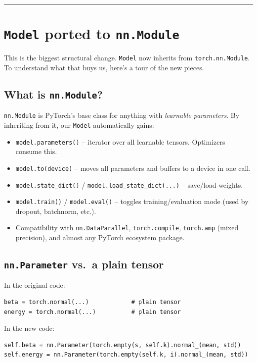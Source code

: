 \documentclass[11pt]{article}
\begin{document}
\bigskip
\hrule
\bigskip

\section{\texttt{Model} ported to \texttt{nn.Module}}
\label{sec:nnmodule}

This is the biggest structural change. \texttt{Model} now inherits from
\texttt{torch.nn.Module}. To understand what that buys us, here's a tour of
the new pieces.

\subsection{What is \texttt{nn.Module}?}

\texttt{nn.Module} is PyTorch's base class for anything with \emph{learnable
parameters}. By inheriting from it, our \texttt{Model} automatically gains:

\begin{itemize}[leftmargin=*, itemsep=2pt]
  \item \texttt{model.parameters()} -- iterator over all learnable tensors. Optimizers consume this.
  \item \texttt{model.to(device)} -- moves all parameters and buffers to a device in one call.
  \item \texttt{model.state\_dict()} / \texttt{model.load\_state\_dict(...)} -- save/load weights.
  \item \texttt{model.train()} / \texttt{model.eval()} -- toggles training/evaluation mode (used by dropout, batchnorm, etc.).
  \item Compatibility with \texttt{nn.DataParallel}, \texttt{torch.compile}, \texttt{torch.amp} (mixed precision), and almost any PyTorch ecosystem package.
\end{itemize}

\subsection{\texttt{nn.Parameter} vs.\ a plain tensor}

In the original code:
\begin{lstlisting}
beta = torch.normal(...)            # plain tensor
energy = torch.normal(...)          # plain tensor
\end{lstlisting}

In the new code:
\begin{lstlisting}
self.beta = nn.Parameter(torch.empty(s, self.k).normal_(mean, std))
self.energy = nn.Parameter(torch.empty(self.k, i).normal_(mean, std))
\end{lstlisting}
\end{document}
